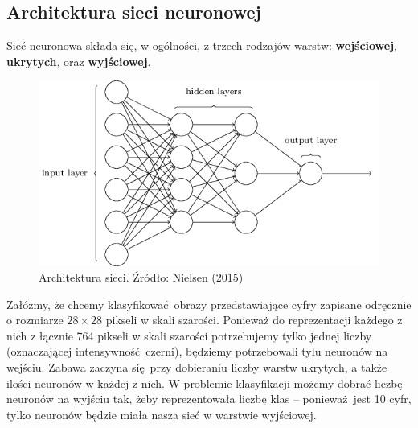 \documentclass[10pt, oneside]{article}
\theoremstyle{remark}
\begin{document}
\subsection{Architektura sieci neuronowej}
Sieć neuronowa składa się, w ogólności, z trzech rodzajów warstw: \textbf{wejściowej}, \textbf{ukrytych}, oraz \textbf{wyjściowej}.
\begin{figure}[htpb]
	\centering
	\includegraphics[width=.5\linewidth]{figures/tikz11}
	\caption{Architektura sieci. Źródło: Nielsen (2015)}
\end{figure}
Załóżmy, że chcemy klasyfikować obrazy przedstawiające cyfry zapisane odręcznie o rozmiarze $28 \times 28$ pikseli w skali szarości.
Ponieważ do reprezentacji każdego z nich z łącznie 764 pikseli w skali szarości potrzebujemy tylko jednej liczby (oznaczającej intensywność czerni), będziemy potrzebowali tylu neuronów na wejściu.
Zabawa zaczyna się przy dobieraniu liczby warstw ukrytych, a także ilości neuronów w każdej z nich.
W problemie klasyfikacji możemy dobrać liczbę neuronów na wyjściu tak, żeby reprezentowała liczbę klas -- ponieważ jest 10 cyfr, tylko neuronów będzie miała nasza sieć w warstwie wyjściowej.
\end{document}
